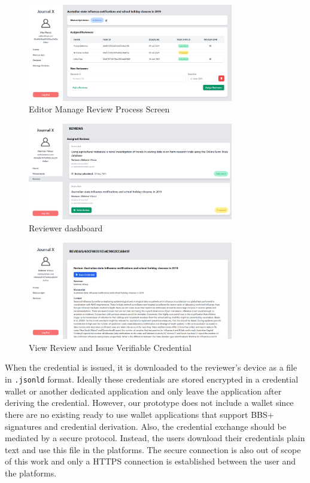 \begin{figure}[htpb]
  \centering
  \includegraphics[width=0.8\textwidth]{figures/editor.png}
  \caption{Editor Manage Review Process Screen} \label{fig:editor}
\end{figure}

\begin{figure}[htpb]
  \centering
  \includegraphics[width=0.8\textwidth]{figures/reviewerScreen.png}
  \caption{Reviewer dashboard} \label{fig:reviewer-screen}
\end{figure}

\begin{figure}[htpb]
  \centering
  \includegraphics[width=0.8\textwidth]{figures/viewReview.png}
  \caption{View Review and Issue Verifiable Credential} \label{fig:view-review}
\end{figure}

When the credential is issued, it is downloaded to the reviewer's device as a file in \lstinline{.jsonld} format. Ideally these credentials are stored encrypted in a credential wallet or another dedicated application and only leave the application after deriving the credential. However, our prototype does not include a wallet since there are no existing ready to use wallet applications that support BBS+ signatures and credential derivation. Also, the credential exchange should be mediated by a secure protocol.  Instead, the users download their credentials plain text and use this file in the platforms. The secure connection is also out of scope of this work and only a HTTPS connection is established between the user and the platforms.

